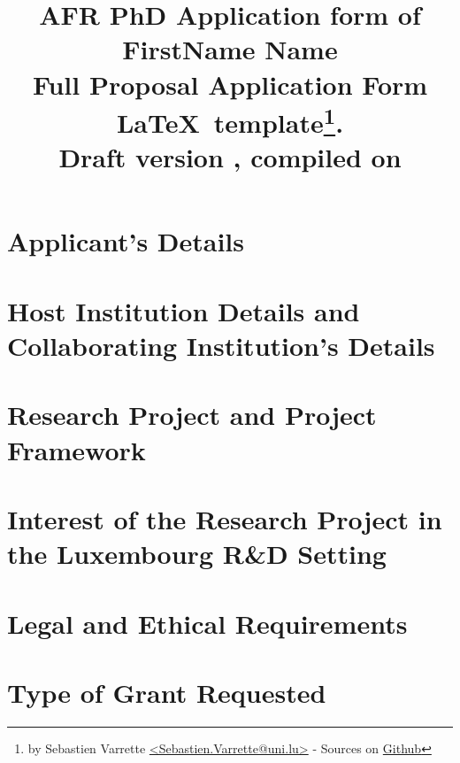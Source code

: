 \documentclass[11pt,twoside,a4paper]{article}
\title{\textbf{\Large AFR PhD Application form of FirstName Name} \\[1em]
  {\small Full Proposal Application Form \LaTeX\ template\thanks{by Sebastien
      Varrette {\small \url{<Sebastien.Varrette@uni.lu>}} - Sources on \href{https://github.com/Falkor/fnr-latex-template}{Github}}.\\
      \textbf{Draft version \docversion}, compiled on \isodayandtime}
}
\author{}
\date{}
\begin{document}
\maketitle

\tableofcontents
\clearpage

\section{Applicant's Details}



\section{Host Institution Details and Collaborating Institution's Details}



\section{Research Project and Project Framework}


\section{Interest of the Research Project in the Luxembourg R\&D Setting}


\section{Legal and Ethical Requirements}


\section{Type of Grant Requested}


\end{document}

